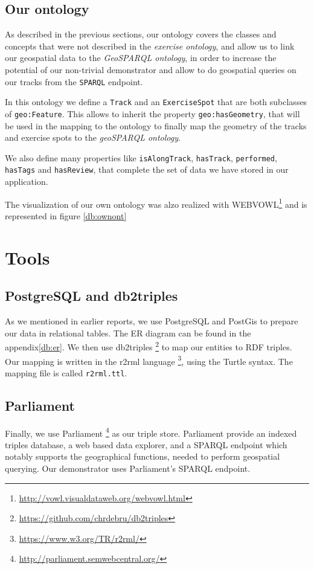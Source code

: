 \documentclass[11pt,a4paper]{scrreprt}
\begin{document}
\section{Our ontology}
As described in the previous sections, our ontology covers the classes and concepts that were not described in the \textit{exercise ontology}, and allow us to link our geospatial data to the \textit{GeoSPARQL ontology}, in order to increase the potential of our non-trivial demonstrator and allow to do geospatial queries on our tracks from the \texttt{SPARQL} endpoint.

In this ontology we define a \texttt{Track} and an \texttt{ExerciseSpot} that are both subclasses of \texttt{geo:Feature}. This allows to inherit the property \texttt{geo:hasGeometry}, that will be used in the mapping to the ontology to finally map the geometry of the tracks and exercise spots to the \textit{geoSPARQL ontology}.

We also define many properties like \texttt{isAlongTrack}, \texttt{hasTrack}, \texttt{performed}, \texttt{hasTags} and \texttt{hasReview}, that complete the set of data we have stored in our application.

The visualization of our own ontology was alzo realized with WEBVOWL\footnote{\url{http://vowl.visualdataweb.org/webvowl.html}} and is represented in figure \ref{db:ownont}

\chapter{Tools}
\section{PostgreSQL and db2triples}
As we mentioned in earlier reports, we use PostgreSQL and PostGis to prepare our data in relational tables. The ER diagram can be found in the appendix\ref{db:er}.  We then use db2triples \footnote{\url{https://github.com/chrdebru/db2triples}} to map our entities to RDF triples. Our mapping is written in the r2rml language \footnote{\url{https://www.w3.org/TR/r2rml/}}, using the Turtle syntax. The mapping file is called \texttt{r2rml.ttl}.

\section{Parliament}
Finally, we use Parliament \footnote{\url{http://parliament.semwebcentral.org/}} as our triple store. Parliament provide an indexed triples database, a web based data explorer, and a SPARQL endpoint which notably supports the geographical functions, needed to perform geospatial querying. Our demonstrator uses Parliament's SPARQL endpoint.
\end{document}
